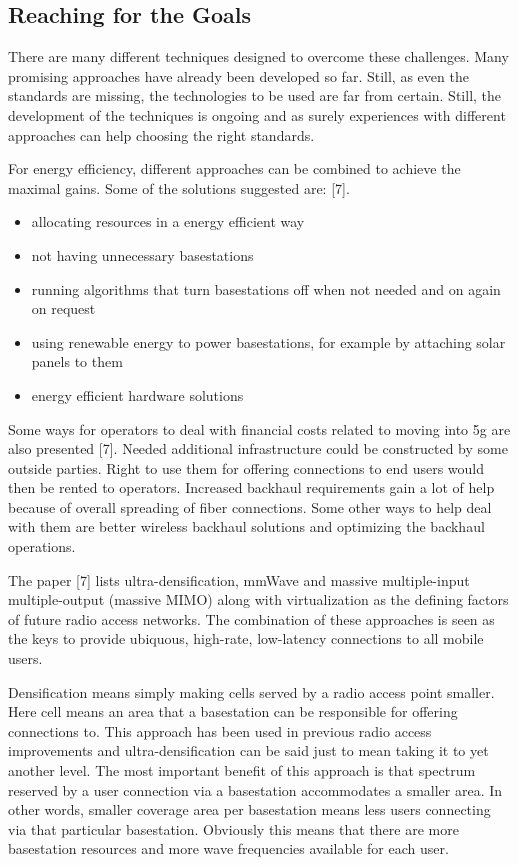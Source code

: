 \documentclass[conference]{IEEEtran}
\begin{document}
\subsection{Reaching for the Goals}
There are many different techniques designed to overcome these challenges. Many promising approaches have already been developed so far. Still, as even the standards are missing, the technologies to be used are far from certain. Still, the development of the techniques is ongoing and as surely experiences with different approaches can help choosing the right standards.
\par
For energy efficiency, different approaches can be combined to achieve the maximal gains. Some of the solutions suggested are: [7].
\begin{itemize}
\item allocating resources in a energy efficient way
\item not having unnecessary basestations
\item running algorithms that turn basestations off when not needed and on again on request
\item using renewable energy to power basestations, for example by attaching solar panels to them
\item energy efficient hardware solutions
\end{itemize}
\par
Some ways for operators to deal with financial costs related to moving into 5g are also presented [7]. Needed additional infrastructure could be constructed by some outside parties. Right to use them for offering connections to end users would then be rented to operators. Increased backhaul requirements gain a lot of help because of overall spreading of fiber connections. Some other ways to help deal with them are better wireless backhaul solutions and optimizing the backhaul operations.
\par
The paper [7] lists ultra-densification, mmWave and massive multiple-input multiple-output (massive MIMO) along with virtualization as the defining factors of future radio access networks. The combination of these approaches is seen as the keys to provide ubiquous, high-rate, low-latency connections to all mobile users.
\par
Densification means simply making cells served by a radio access point smaller. Here cell means an area that a basestation can be responsible for offering connections to. This approach has been used in previous radio access improvements and ultra-densification can be said just to mean taking it to yet another level. The most important benefit of this approach is that spectrum reserved by a user connection via a basestation accommodates a smaller area. In other words, smaller coverage area per basestation means less users connecting via that particular basestation. Obviously this means that there are more basestation resources and more wave frequencies available for each user.
\end{document}
